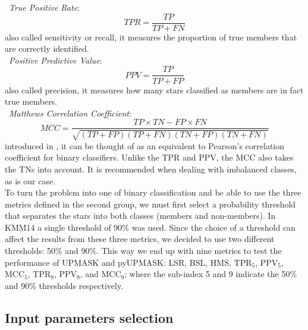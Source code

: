 \documentclass[draft]{aa}
\begin{document}
 \noindent \textbullet\ \emph{True Positive Rate}:
 \begin{equation}
 TPR = \frac{TP}{TP+FN}
 \end{equation}
 \noindent also called sensitivity or recall, it measures the proportion of
 true members that are correctly identified.\\

 \noindent \textbullet\ \emph{Positive Predictive Value}:
 \begin{equation}
 PPV = \frac{TP}{TP+FP}
 \end{equation}
 \noindent also called precision, it measures how many stars classified as
 members are in fact true members.\\

 \noindent \textbullet\ \emph{Matthews Correlation Coefficient}:
 \begin{equation}
 MCC = \frac{TP \times TN - FP \times FN}{\sqrt{(TP + FP)(TP + FN)(TN + FP)(TN + FN)}}
 \end{equation}
 \noindent introduced in \cite{Matthews_1975}, it can be thought of as an
 equivalent to Pearson's correlation coefficient for binary classifiers. Unlike
 the TPR and PPV, the MCC also takes the TNs into account. It is
 recommended when dealing with imbalanced classes, as is our case.\\

 \noindent To turn the problem into one of binary classification and be able
 to use the three metrics defined in the second group, we must first select a
 probability threshold that separates the stars into both classes (members and
 non-members). In KMM14 a single threshold of 90\% was used. Since the choice
 of a threshold can affect the results from these three metrics, we decided
 to use two different thresholds: 50\% and 90\%. This way we end up with nine
 metrics to test the performance of UPMASK and pyUPMASK: LSR, BSL, HMS, TPR$_5$,
 PPV$_5$, MCC$_5$, TPR$_9$, PPV$_9$, and MCC$_9$; where the sub-index 5 and 9
 indicate the 50\% and 90\% thresholds respectively.



\subsection{Input parameters selection}
 \label{ssec:input_pars}
\end{document}
